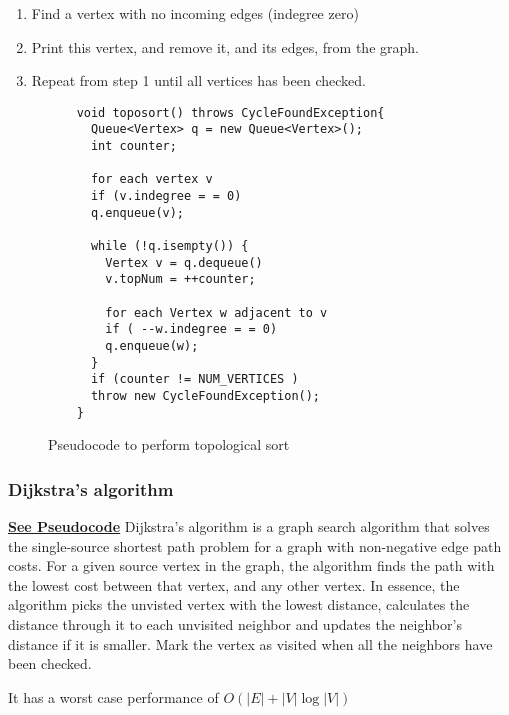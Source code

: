 \documentclass[paper=a4, fontsize=11pt]{scrartcl}
\numberwithin{equation}{section} %
\numberwithin{figure}{section} %
\numberwithin{table}{section} %
\theoremstyle{definition}
\begin{document}
\begin{enumerate}
  \item Find a vertex with no incoming edges (indegree zero)
  \item Print this vertex, and remove it, and its edges, from the graph.
  \item Repeat from step 1 until all vertices has been checked.
\end{enumerate}
\begin{figure}[p]
  \begin{verbatim}
    void toposort() throws CycleFoundException{
      Queue<Vertex> q = new Queue<Vertex>();
      int counter;

      for each vertex v
      if (v.indegree = = 0)
      q.enqueue(v);

      while (!q.isempty()) {
        Vertex v = q.dequeue()
        v.topNum = ++counter;

        for each Vertex w adjacent to v
        if ( --w.indegree = = 0)
        q.enqueue(w);
      }
      if (counter != NUM_VERTICES )
      throw new CycleFoundException();
    }
  \end{verbatim}
  \caption{Pseudocode to perform topological sort}
  \label{toposort}
\end{figure}

\subsubsection{Dijkstra's algorithm}
\hyperref[dijkalg]{\textbf{See Pseudocode}}
Dijkstra's algorithm is a graph search algorithm that solves the single-source
shortest path problem for a graph with non-negative edge path costs.  For a
given source vertex in the graph, the algorithm finds the path with the lowest
cost between that vertex, and any other vertex.  In essence, the algorithm
picks the unvisted vertex with the lowest distance, calculates the distance
through it to each unvisited neighbor and updates the neighbor's distance if it
is smaller. Mark the vertex as visited when all the neighbors have been
checked.

It has a worst case performance of \(O\left(|E| + |V|\log|V|\right)\)
\end{document}
